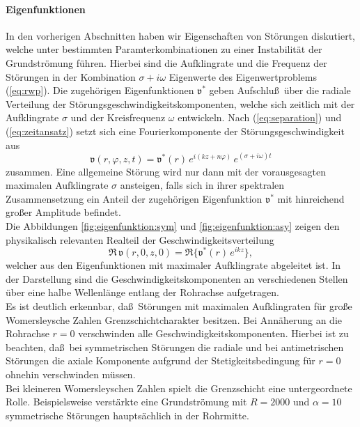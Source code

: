 \documentclass[10pt,a5paper,oneside,draft]{book}
\numberwithin{equation}{chapter}
\begin{document}
\paragraph{Eigenfunktionen}
In den vorherigen Abschnitten haben wir Eigenschaften von St\"orungen diskutiert, welche unter bestimmten Paramterkombinationen zu einer Instabilit\"at der Grundstr\"omung f\"uhren.
Hierbei sind die Aufklingrate und die Frequenz der St\"orungen in der Kombination $\sigma+i\omega$ Eigenwerte des Eigenwertproblems (\mbox{\ref{eq:rwp}}).
Die zugeh\"origen Eigenfunktionen $\mathfrak{v}^*$ geben Aufschlu\ss\ \"uber die radiale Verteilung der St\"orungsgeschwindigkeitskomponenten, welche sich zeitlich mit der Aufklingrate $\sigma$ und der Kreisfrequenz $\omega$ entwickeln.
Nach  (\mbox{\ref{eq:separation}}) und  (\mbox{\ref{eq:zeitansatz}}) setzt sich eine Fourierkomponente der St\"orungsgeschwindigkeit aus
\begin{equation}
	\mathfrak{v}(r,\varphi,z,t) = \mathfrak{v}^*(r) \, e^{i(kz+n\varphi)}\, e^{(\sigma+i\omega)t}
\end{equation}
zusammen.
Eine allgemeine St\"orung wird nur dann mit der vorausgesagten maximalen Aufklingrate $\sigma$ ansteigen, falls sich in ihrer spektralen Zusammensetzung ein Anteil der zugeh\"origen Eigenfunktion $\mathfrak{v}^*$ mit hinreichend gro\ss er Amplitude befindet.\\
Die Abbildungen \ref{fig:eigenfunktion:sym} und \ref{fig:eigenfunktion:asy} zeigen den physikalisch relevanten Realteil der Geschwindigkeitsverteilung
\begin{equation}
	\Re \, \mathfrak{v}(r,0,z,0) = \Re\{\mathfrak{v}^*(r) \, e^{ikz}\},
\end{equation}
welcher aus den Eigenfunktionen mit maximaler Aufklingrate abgeleitet ist.
In der Darstellung sind die Geschwindigkeitskomponenten an verschiedenen Stellen \"uber eine halbe Wellenl\"ange entlang der Rohrachse aufgetragen.\\
Es ist deutlich erkennbar, da\ss\ St\"orungen mit maximalen Aufklingraten f\"ur gro\ss e Womersleysche Zahlen Grenzschichtcharakter besitzen.
Bei Ann\"aherung an die Rohrachse $r=0$ verschwinden alle Geschwindigkeitskomponenten.
Hierbei ist zu beachten, da\ss\ bei symmetrischen St\"orungen die radiale und bei antimetrischen St\"orungen die axiale Komponente aufgrund der Stetigkeitsbedingung f\"ur $r=0$ ohnehin verschwinden m\"ussen.\\
Bei kleineren Womersleyschen Zahlen spielt die Grenzschicht eine untergeordnete Rolle.
Beispielsweise verst\"arkte eine Grundstr\"omung mit $R=2000$ und $\alpha=10$ symmetrische St\"orungen haupts\"achlich in der Rohrmitte.
\end{document}

